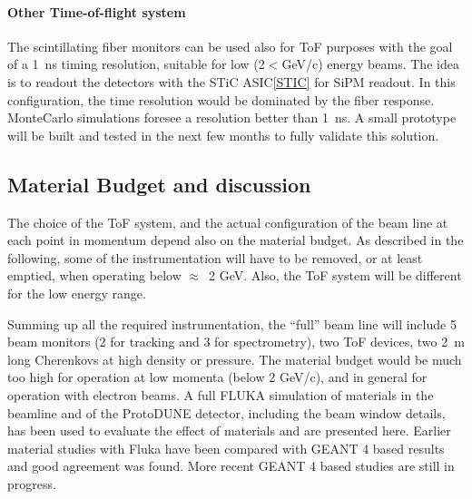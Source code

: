\paragraph{Other Time-of-flight system}
The  scintillating fiber monitors can be used also for ToF purposes with the goal of a 1~ns timing resolution, suitable for low (2$<$GeV/c) energy beams. The idea is to readout the detectors with the STiC ASIC\ref{STIC} for SiPM readout.
In this configuration, the time resolution would be dominated by the fiber response. MonteCarlo simulations foresee a resolution better than 1~ns. 
A small prototype will be built and tested in the next few months to fully validate this solution.


\subsection{Material Budget and discussion}
\label{beam-material-budget}
The choice of the ToF system, and the actual configuration of the beam line at each point in momentum depend also on the material budget. As described in the following, some of the instrumentation will have to be removed, or at least emptied, when operating below $\approx$~2 GeV. Also, the ToF system will be different for the low energy range.

Summing up all the required instrumentation, the ``full'' beam line will  include
 5 beam monitors (2 for tracking and 3 for spectrometry), two ToF devices, two 2~m long Cherenkovs at high density or pressure. The material budget would be much too high for operation at low momenta (below 2 GeV/c), 
 and in general for operation with electron beams.  
A full FLUKA\cite{fluka05,Fluka15}  simulation of materials in the beamline and of the ProtoDUNE detector, including the beam window details, has been used to evaluate the effect of materials and are presented here. 
Earlier material studies with Fluka have been compared with GEANT 4 based results and good agreement was found. More recent GEANT 4 based studies are still in progress.

